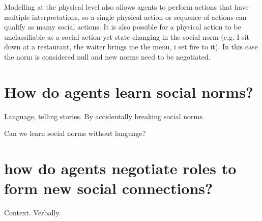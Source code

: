 \documentclass[a4paper]{article}
\begin{document}
Modelling at the physical level also allows agents to perform actions that have multiple interpretations, so a single physical action or sequence of actions can qualify as mamy social actions. It is also possible for a physical action to be unclassifiable as a social action yet state changing in the social norm (e.g. I sit down at a restaurant, the waiter brings me the menu, i set fire to it). In this case the norm is considered null and new norms need to be negotiated.

\section{How do agents learn social norms?}

Language, telling stories. By accidentally breaking social norms.

Can we learn social norms without language?

\section{how do agents negotiate roles to form new social connections?}
Context. Verbally.
\end{document}
